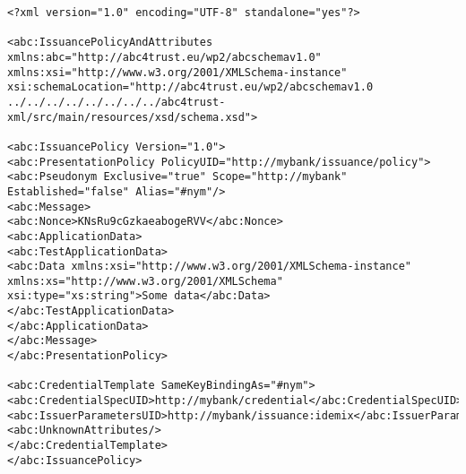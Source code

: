 \begin{lstlisting}[caption=Issuance Policy and Attributes]
<?xml version="1.0" encoding="UTF-8" standalone="yes"?>

<abc:IssuancePolicyAndAttributes 
xmlns:abc="http://abc4trust.eu/wp2/abcschemav1.0" xmlns:xsi="http://www.w3.org/2001/XMLSchema-instance" 
xsi:schemaLocation="http://abc4trust.eu/wp2/abcschemav1.0 ../../../../../../../../abc4trust-xml/src/main/resources/xsd/schema.xsd">

<abc:IssuancePolicy Version="1.0">
<abc:PresentationPolicy PolicyUID="http://mybank/issuance/policy">
<abc:Pseudonym Exclusive="true" Scope="http://mybank" Established="false" Alias="#nym"/>
<abc:Message>
<abc:Nonce>KNsRu9cGzkaeabogeRVV</abc:Nonce>
<abc:ApplicationData>
<abc:TestApplicationData>
<abc:Data xmlns:xsi="http://www.w3.org/2001/XMLSchema-instance" xmlns:xs="http://www.w3.org/2001/XMLSchema"
xsi:type="xs:string">Some data</abc:Data>
</abc:TestApplicationData>
</abc:ApplicationData>
</abc:Message>
</abc:PresentationPolicy>

<abc:CredentialTemplate SameKeyBindingAs="#nym">
<abc:CredentialSpecUID>http://mybank/credential</abc:CredentialSpecUID>
<abc:IssuerParametersUID>http://mybank/issuance:idemix</abc:IssuerParametersUID>
<abc:UnknownAttributes/>
</abc:CredentialTemplate>
</abc:IssuancePolicy>


\end{lstlisting}
